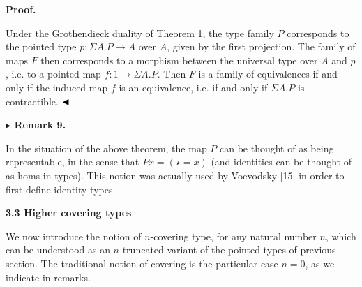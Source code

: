 \documentclass[10pt,a4paper]{article}
\begin{document}
 
 
 
 
\par\medskip\noindent\textbf{Proof.}\par
 
 
Under the Grothendieck duality of Theorem 1, the type family $P$ corresponds to the pointed type $p:\Sigma A.P\to A$ over $A$, given by the first projection. The family of maps $F$ then corresponds to a morphism between the universal type over $A$ and $p$, i.e. to a pointed map $f:1\to\Sigma A.P$. Then $F$ is a family of equivalences if and only if the induced map $f$ is an equivalence, i.e. if and only if $\Sigma A.P$ is contractible. $\hfill\blacktriangleleft$\par
 
 
 
\par\medskip\noindent\textbf{$\blacktriangleright$ Remark 9.}\par
 
 
In the situation of the above theorem, the map $P$ can be thought of as being representable, in the sense that $Px=(\star=x)$ (and identities can be thought of as homs in types). This notion was actually used by Voevodsky [15] in order to first define identity types.\par
 
 
 
 
 
 
\par\medskip\noindent\textbf{3.3 Higher covering types}\par
 
 
We now introduce the notion of $n$-covering type, for any natural number $n$, which can be understood as an $n$-truncated variant of the pointed types of previous section. The traditional notion of covering is the particular case $n=0$, as we indicate in remarks.\par
 
\end{document}
